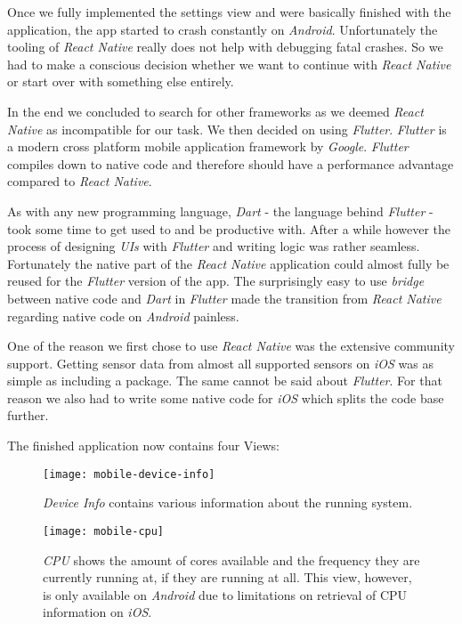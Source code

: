 Once we fully implemented the settings view and were basically finished with the application, the
app started to crash constantly on \textit{Android}. Unfortunately the tooling of \textit{React
Native} really does not help with debugging fatal crashes. So we had to make a conscious decision
whether we want to continue with \textit{React Native} or start over with something else entirely.

In the end we concluded to search for other frameworks as we deemed \textit{React Native} as
incompatible for our task. We then decided on using \textit{Flutter}. \textit{Flutter} is a modern
cross platform mobile application framework by \textit{Google}. \textit{Flutter} compiles down to
native code and therefore should have a performance advantage compared to \textit{React Native}.

As with any new programming language, \textit{Dart} - the language behind \textit{Flutter} - took
some time to get used to and be productive with. After a while however the process of designing
\textit{UIs} with \textit{Flutter} and writing logic was rather seamless. Fortunately the native
part of the \textit{React Native} application could almost fully be reused for the \textit{Flutter}
version of the app. The surprisingly easy to use \textit{bridge} between native code and
\textit{Dart} in \textit{Flutter} made the transition from \textit{React Native} regarding native
code on \textit{Android} painless.

One of the reason we first chose to use \textit{React Native} was the extensive community support.
Getting sensor data from almost all supported sensors on \textit{iOS} was as simple as including a
package. The same cannot be said about \textit{Flutter}. For that reason we also had to write some
native code for \textit{iOS} which splits the code base further.

The finished application now contains four Views:

\begin{figure}[H]
  \centering
  \texttt{[image: mobile-device-info]}
  \caption{\textit{Device Info} contains various information about the running system.}
\end{figure}

\begin{figure}[H]
  \centering
  \texttt{[image: mobile-cpu]}
  \caption{\textit{CPU} shows the amount of cores available and the frequency they are currently
  running at, if they are running at all. This view, however, is only available on \textit{Android}
  due to limitations on retrieval of CPU information on \textit{iOS}.}
\end{figure}

